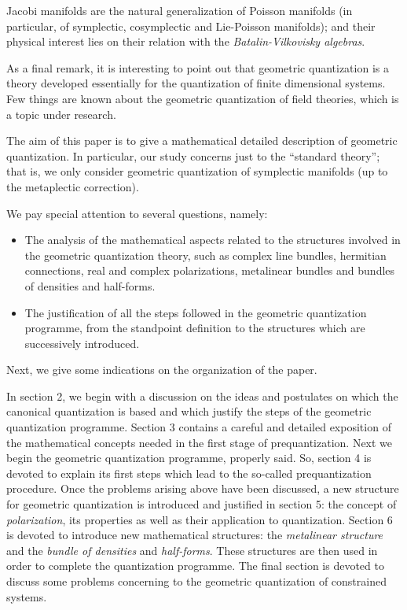 \documentclass[12pt]{article}
\theoremstyle{plain}
\begin{document}
Jacobi manifolds are the natural generalization of Poisson manifolds
(in particular, of symplectic, cosymplectic and Lie-Poisson manifolds);
and their physical interest lies on their relation with the
{\it Batalin-Vilkovisky algebras}.

As a final remark, it is interesting to point out that
geometric quantization is a theory developed essentially
for the quantization of finite dimensional systems.
Few things are known about the geometric quantization of
field theories, which is a topic under research.

The aim of this paper is to give a mathematical detailed description of
geometric quantization. In particular, our study concerns
just to the ``standard theory''; that is, we only consider geometric
quantization
of symplectic manifolds (up to the metaplectic correction).

We pay special attention to several questions, namely:
\begin{itemize}
\item
The analysis of the mathematical aspects related
to the structures involved in the geometric
quantization theory, such as complex line bundles, hermitian
connections,
real and complex polarizations, metalinear bundles and
bundles of densities and half-forms.
\item
The justification of all the steps followed in the geometric
quantization programme,
 from the standpoint definition to the structures which are successively
introduced.
\end{itemize}
Next, we give some indications on the organization of the paper.

In section 2, we begin with a discussion on the ideas and postulates on
which the canonical
quantization is based and which justify the steps of the geometric
quantization programme.
Section 3 contains a careful and detailed exposition
of the mathematical concepts needed in the first stage of
prequantization.
Next we begin the geometric quantization programme, properly said.
So, section 4 is devoted to explain its first steps
which lead to the so-called prequantization procedure.
Once the problems arising above have been discussed,
a new structure for geometric quantization is introduced and justified
in section 5: the concept of {\it polarization}, its
properties as well as their application to quantization.
Section 6 is devoted to introduce new mathematical structures:
the {\it metalinear structure} and the {\it bundle of densities} and
{\it half-forms}.
These structures are then used in order to complete the quantization
programme.
The final section is devoted to discuss some problems concerning to
the geometric quantization of constrained systems.
\end{document}

